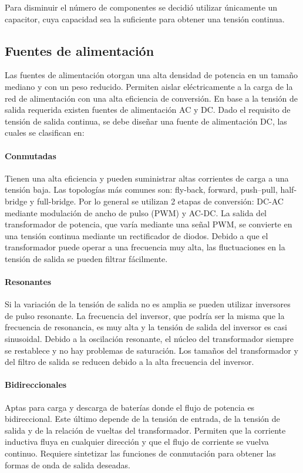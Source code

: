 Para disminuir el número de componentes se decidió utilizar únicamente
un capacitor, cuya capacidad sea la suficiente para obtener una tensión continua.

\subsection{Fuentes de alimentación}

Las fuentes de alimentación otorgan una alta densidad de potencia en un tamaño mediano y con un peso reducido.  
Permiten aislar eléctricamente a la carga de la red de alimentación con una alta eficiencia de conversión.  
En base a la tensión de salida requerida existen fuentes de alimentación AC y DC.
Dado el requisito de tensión de salida continua, se debe diseñar una fuente de alimentación DC, las cuales se clasifican en:

\paragraph{Conmutadas}
Tienen una alta eficiencia y pueden suministrar altas corrientes de carga a una tensión baja.
Las topologías más comunes son: fly-back, forward, push–pull, half-bridge y full-bridge.
Por lo general se utilizan 2 etapas de conversión: DC-AC mediante modulación de ancho de pulso (PWM) y AC-DC.
La salida del transformador de potencia, que varía mediante una señal PWM, se convierte en una tensión continua mediante un rectificador de diodos. 
Debido a que el transformador puede operar a una frecuencia muy alta, las fluctuaciones en la tensión de salida se pueden filtrar fácilmente.

\paragraph{Resonantes}
Si la variación de la tensión de salida no es amplia se pueden utilizar inversores de pulso resonante. 
La frecuencia del inversor, que podría ser la misma que la frecuencia de resonancia, es muy alta y la tensión de salida del inversor es casi sinusoidal.
Debido a la oscilación resonante, el núcleo del transformador siempre se restablece y no hay problemas de saturación. 
Los tamaños del transformador y del filtro de salida se reducen debido a la alta frecuencia del inversor.

\paragraph{Bidireccionales}
Aptas para carga y descarga de baterías donde el flujo de potencia es bidireccional.
Este último depende de la tensión de entrada, de la tensión de salida y de la relación de vueltas del transformador. 
Permiten que la corriente inductiva fluya en cualquier dirección y que el flujo de corriente se vuelva continuo.
Requiere sintetizar las funciones de conmutación para obtener las formas de onda de salida deseadas.\\


